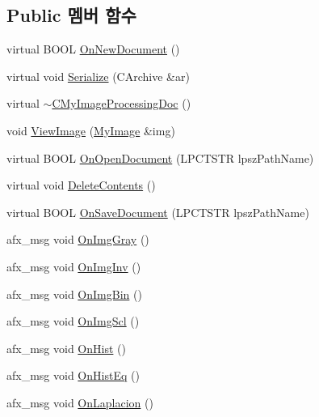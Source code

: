 \subsection*{Public 멤버 함수}
\begin{DoxyCompactItemize}
\item 
virtual B\-O\-O\-L \hyperlink{class_c_my_image_processing_doc_ace51febeb853241b30e372aeec5c736c}{On\-New\-Document} ()
\item 
virtual void \hyperlink{class_c_my_image_processing_doc_afccbabdc62acc9c794684f19ba91706c}{Serialize} (C\-Archive \&ar)
\item 
virtual \hyperlink{class_c_my_image_processing_doc_af38a8ca89b352f41e050415e15f4414a}{$\sim$\-C\-My\-Image\-Processing\-Doc} ()
\item 
void \hyperlink{class_c_my_image_processing_doc_a6b945ff1dea330304876d455efbce925}{View\-Image} (\hyperlink{class_my_image}{My\-Image} \&img)
\item 
virtual B\-O\-O\-L \hyperlink{class_c_my_image_processing_doc_a298ff63e6cf66c8e034a1b23439e36a0}{On\-Open\-Document} (L\-P\-C\-T\-S\-T\-R lpsz\-Path\-Name)
\item 
virtual void \hyperlink{class_c_my_image_processing_doc_a27823ce295ac534756ddd1c5c672c963}{Delete\-Contents} ()
\item 
virtual B\-O\-O\-L \hyperlink{class_c_my_image_processing_doc_a462530f8b6ba55216a02afd079e54a85}{On\-Save\-Document} (L\-P\-C\-T\-S\-T\-R lpsz\-Path\-Name)
\item 
afx\-\_\-msg void \hyperlink{class_c_my_image_processing_doc_a3922aa78dfd3a645704b51650716bc5d}{On\-Img\-Gray} ()
\item 
afx\-\_\-msg void \hyperlink{class_c_my_image_processing_doc_adf46e407c93d02b63a668c7ac5089d57}{On\-Img\-Inv} ()
\item 
afx\-\_\-msg void \hyperlink{class_c_my_image_processing_doc_a222391b07cb5517c953f291975d3a4ae}{On\-Img\-Bin} ()
\item 
afx\-\_\-msg void \hyperlink{class_c_my_image_processing_doc_ac3eb4d895a330361dfc6dfcdb48c9437}{On\-Img\-Scl} ()
\item 
afx\-\_\-msg void \hyperlink{class_c_my_image_processing_doc_a224d7b1fc7bcf0f034e5e0b3d46c186e}{On\-Hist} ()
\item 
afx\-\_\-msg void \hyperlink{class_c_my_image_processing_doc_a5f3fbe7ce6035ae4837adc633517ade2}{On\-Hist\-Eq} ()
\item 
afx\-\_\-msg void \hyperlink{class_c_my_image_processing_doc_a8d8f9f5aacf4200ccb0047aa1afd949a}{On\-Laplacion} ()

\end{DoxyCompactItemize}
